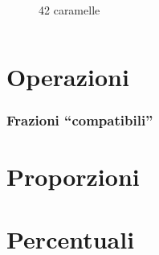 \documentclass[]{beamer}
\theoremstyle{plain}
\begin{document}
\begin{frame}
{\begin{columns}
\begin{column}{0.4\textwidth}
\begin{figure}
      42 caramelle
    \end{figure} 
  \end{column}
\end{columns}}
\end{frame}

\section{Operazioni}


\begin{frame}
\frametitle{Frazioni ``compatibili''}

\end{frame}

\section{Proporzioni}



\section{Percentuali}
\end{document}
